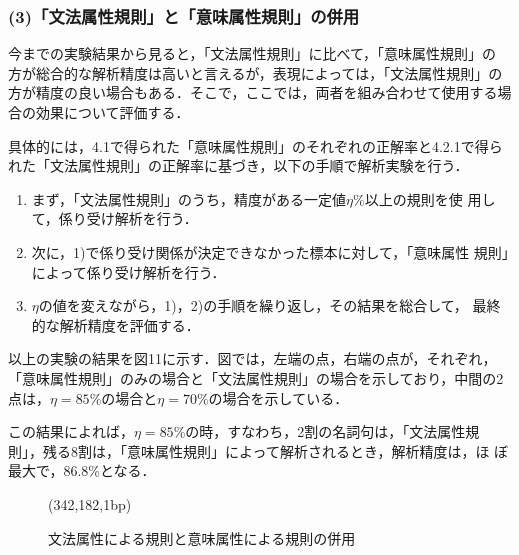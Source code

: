 \subsubsection*{(3)「文法属性規則」と「意味属性規則」の併用}

今までの実験結果から見ると，「文法属性規則」に比べて，「意味属性規則」の
方が総合的な解析精度は高いと言えるが，表現によっては，「文法属性規則」の
方が精度の良い場合もある．そこで，ここでは，両者を組み合わせて使用する場
合の効果について評価する．

具体的には，4.1で得られた「意味属性規則」のそれぞれの正解率と4.2.1で得られた「文法属性規則」の正解率に基づき，以下の手順で解析実験を行う．\vspace{\baselineskip}

\renewcommand{\labelenumi}{}
\begin{enumerate}
 \item まず，「文法属性規則」のうち，精度がある一定値$\eta\%$以上の規則を使
       用して，係り受け解析を行う．
 \item 次に，1)で係り受け関係が決定できなかった標本に対して，「意味属性
       規則」によって係り受け解析を行う．
 \item $\eta$の値を変えながら，1)，2)の手順を繰り返し，その結果を総合して，
       最終的な解析精度を評価する．
\end{enumerate}\vspace{\baselineskip}

以上の実験の結果を図11に示す．図では，左端の点，右端の点が，それぞれ，
「意味属性規則」のみの場合と「文法属性規則」の場合を示しており，中間の2点は，$\eta=85\%$の場合と$\eta=70\%$の場合を示している．

この結果によれば，$\eta=85\%$の時，すなわち，2割の名詞句は，「文法属性規
則」，残る8割は，「意味属性規則」によって解析されるとき，解析精度は，ほ
ぼ最大で，$86.8\%$となる．

\begin{figure}[thb]
\begin{center}
\begin{epsf}
\end{epsf}
\begin{draft}
\atari(342,182,1bp)
\end{draft}
\end{center}
\vspace*{-4mm}
\caption{文法属性による規則と意味属性による規則の併用}
\label{fig:文法属性による規則と意味属性による規則の併用}
\end{figure}

